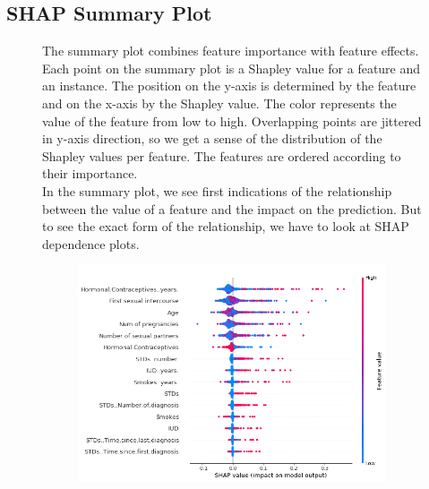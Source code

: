 \subsection{SHAP Summary Plot}
\begin{figure}[H]
    \centering
    \begin{minipage}{0.40\textwidth}
        The summary plot combines feature importance with feature effects. Each point on the summary plot is a Shapley value for a feature and an instance. The position on the y-axis is determined by the feature and on the x-axis by the Shapley value. The color represents the value of the feature from low to high. Overlapping points are jittered in y-axis direction, so we get a sense of the distribution of the Shapley values per feature. The features are ordered according to their importance.\\

        In the summary plot, we see first indications of the relationship between the value of a feature and the impact on the prediction. But to see the exact form of the relationship, we have to look at SHAP dependence plots.
    \end{minipage}
    \hfill
    \begin{minipage}{0.55\textwidth}
        \begin{figure}[H]
            \includegraphics[width=\textwidth]{img/shap-importance-extended.png}
            \centering
        \end{figure}
    \end{minipage}
\end{figure}


